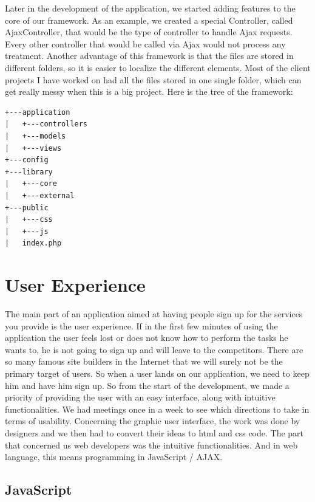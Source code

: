 Later in the development of the application, we started adding features to the core of our framework. As an example, we created a special Controller, called AjaxController, that would be the type of controller to handle Ajax requests. Every other controller that would be called via Ajax would not process any treatment.
Another advantage of this framework is that the files are stored in different folders, so it is easier to localize the different elements. Most of the client projects I have worked on had all the files stored in one single folder, which can get really messy when this is a big project.
Here is the tree of the framework:
\begin{verbatim}
+---application
|   +---controllers
|   +---models
|   +---views
+---config
+---library
|   +---core
|   +---external
+---public
|   +---css
|   +---js
|   index.php
\end{verbatim}

\section{User Experience}

The main part of an application aimed at having people sign up for the services you provide is the user experience. If in the first few minutes of using the application the user feels lost or does not know how to perform the tasks he wants to, he is not going to sign up and will leave to the competitors. There are so many famous site builders in the Internet that we will surely not be the primary target of users. So when a user lands on our application, we need to keep him and have him sign up. So from the start of the development, we made a priority of providing the user with an easy interface, along with intuitive functionalities.
We had meetings once in a week to see which directions to take in terms of usability. Concerning the graphic user interface, the work was done by designers and we then had to convert their ideas to html and css code. The part that concerned us web developers was the intuitive functionalities. And in web language, this means programming in JavaScript / AJAX.

\subsection{JavaScript}

